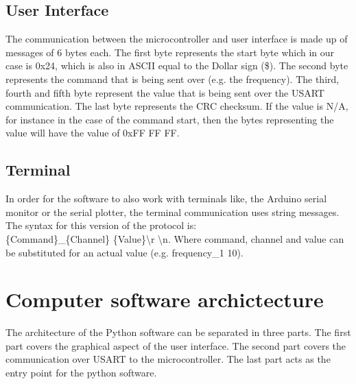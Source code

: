 \documentclass[conference]{IEEEtran}
\begin{document}
\subsection{User Interface}\label{UI_communication}
The communication between the microcontroller and user interface is made up of messages of 6 bytes each. The first byte represents the start byte which in our case is 0x24, which is also in ASCII equal to the Dollar sign (\$). The second byte represents the command that is being sent over (e.g. the frequency). The third, fourth and fifth byte represent the value that is being sent over the USART communication. The last byte represents the CRC checksum. If the value is N/A, for instance in the case of the command start, then the bytes representing the value will have the value of 0xFF FF FF.

\subsection{Terminal}
In order for the software to also work with terminals like, the Arduino serial monitor or the serial plotter, the terminal communication uses string messages. The syntax for this version of the protocol is:
\\ \{Command\}\_\{Channel\} \{Value\}\textbackslash r \textbackslash n. Where command, channel and value can be substituted for an actual value (e.g. frequency\_1 10).



\section{Computer software archictecture}

The architecture of the Python software can be separated in three parts. The first part covers the graphical aspect of the user interface. The second part covers the communication over USART to the microcontroller. The last part acts as the entry point for the python software.
\end{document}
